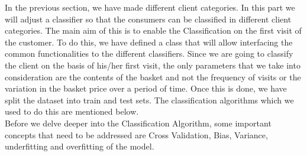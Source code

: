 In the previous section, we have made different client categories. In this part we will adjust a classifier so that the consumers can be classified in different client categories. The main aim of this is to enable the Classification on the first visit of the customer. To do this, we have defined a class that will allow interfacing the common functionalities to the different classifiers. Since we are going to classify the client on the basis of his/her first visit, the only parameters that we take into consideration are the contents of the basket and not the frequency of visits or the variation in the basket price over a period of time. Once this is done, we have split the dataset into train and test sets. The classification algorithms which we used to do this are mentioned below.\\
Before we delve deeper into the Classification Algorithm, some important concepts that need to be addressed are Cross Validation, Bias, Variance, underfitting and overfitting of the model.
